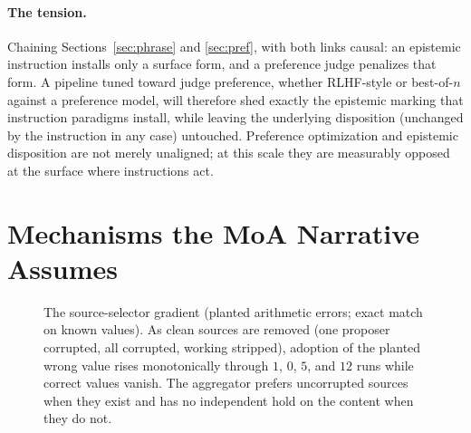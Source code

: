 \documentclass[11pt]{article}
\begin{document}
\paragraph{The tension.} Chaining Sections~\ref{sec:phrase} and
\ref{sec:pref}, with both links causal: an epistemic instruction
installs only a surface form, and a preference judge penalizes that
form. A pipeline tuned toward judge preference, whether RLHF-style or
best-of-$n$ against a preference model, will therefore shed exactly the
epistemic marking that instruction paradigms install, while leaving the
underlying disposition (unchanged by the instruction in any case)
untouched. Preference optimization and epistemic disposition are not
merely unaligned; at this scale they are measurably opposed at the
surface where instructions act.

\section{Mechanisms the MoA Narrative Assumes}
\label{sec:mech}

\begin{figure}[t]
\centering
{}
\caption{The source-selector gradient (planted arithmetic errors; exact
match on known values). As clean sources are removed (one proposer
corrupted, all corrupted, working stripped), adoption of the planted
wrong value rises monotonically through $1$, $0$, $5$, and $12$ runs
while correct values vanish. The aggregator prefers uncorrupted sources
when they exist and has no independent hold on the content when they
do not.}
\label{fig:grad}
\end{figure}
\end{document}
